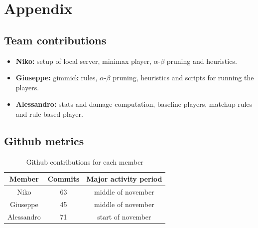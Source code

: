 \appendix
\section{Appendix}\label{sec:appendix}
\subsection{Team contributions}\label{appendix:team_contributions}
\begin{itemize}
    \item \textbf{Niko:} setup of local server, minimax player, $\alpha$-$\beta$ pruning and heuristics.
    \item \textbf{Giuseppe:} gimmick rules, $\alpha$-$\beta$ pruning, heuristics and scripts for running the players.
    \item \textbf{Alessandro:} stats and damage computation, baseline players, matchup rules and rule-based player.
\end{itemize}

\subsection{Github metrics}\label{appendix:github_metrics}
\begin{table}[!htbp]
    \footnotesize
    \centering
    \begin{tabular}{c|c|c}
        \hline \hline
         \textbf{Member} & \textbf{Commits} & \textbf{Major activity period} \\ \hline \hline
         Niko & 63 & middle of november \\ \hline
         Giuseppe & 45 & middle of november \\ \hline
         Alessandro & 71 & start of november \\ \hline \hline
    \end{tabular}
    \caption{Github contributions for each member}
    \label{tab:git_contributions}
\end{table}

